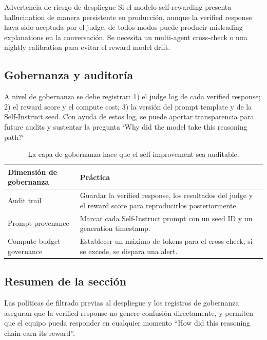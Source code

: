 \documentclass[a4paper]{article}
\begin{document}
\begin{warningbox}{Advertencia de riesgo de despliegue}
Si el modelo self-rewarding presenta hallucination de manera persistente en producción, aunque la verified response haya sido aceptada por el judge, de todos modos puede producir misleading explanations en la conversación. Se necesita un multi-agent cross-check o una nightly calibration para evitar el reward model drift.
\end{warningbox}

\subsection{Gobernanza y auditoría}
A nivel de gobernanza se debe registrar: 1) el judge log de cada verified response; 2) el reward score y el compute cost; 3) la versión del prompt template y de la Self-Instruct seed. Con ayuda de estos log, se puede aportar transparencia para future audits y sustentar la pregunta `Why did the model take this reasoning path?`

\begin{table}[H]
\centering
\begin{tabular}{p{5cm}p{10cm}}
\toprule
Dimensión de gobernanza & Práctica \\
\midrule
Audit trail & Guardar la verified response, los resultados del judge y el reward score para reproducirlos posteriormente. \\
Prompt provenance & Marcar cada Self-Instruct prompt con un seed ID y un generation timestamp. \\
Compute budget governance & Establecer un máximo de tokens para el cross-check; si se excede, se dispara una alert. \\
\bottomrule
\end{tabular}
\caption{La capa de gobernanza hace que el self-improvement sea auditable.}
\end{table}

\subsection{Resumen de la sección}
Las políticas de filtrado previas al despliegue y los registros de gobernanza aseguran que la verified response no genere confusión directamente, y permiten que el equipo pueda responder en cualquier momento ``How did this reasoning chain earn its reward''.
\end{document}
